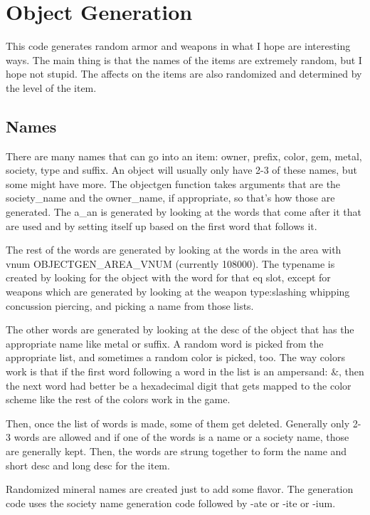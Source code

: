 \chapter{Object Generation}


This code generates random armor and weapons in what I hope are
interesting ways. The main thing is that the names of the items
are extremely random, but I hope not stupid. The affects on the
items are also randomized and determined by the level of the item.

\section{Names}

There are many names that can go into an item: owner, prefix, color, gem,
metal, society, type and suffix. An object will usually only have 2-3 of these
names, but some might have more. The objectgen function takes arguments that
are the society\_name and the owner\_name, if appropriate, so that's how
those are generated. The a\_an is generated by looking at the words that
come after it that are used and by setting itself up based on the 
first word that follows it.

The rest of the words are generated by looking at the words in the area with
vnum OBJECTGEN\_AREA\_VNUM (currently 108000). The typename is created
by looking for the object with the word for that eq slot, except for
weapons which are generated by looking at the weapon type:slashing whipping
concussion piercing, and picking a name from those lists.

The other words are generated by looking at the desc of the object
that has the appropriate name like metal or suffix. A random word is
picked from the appropriate list, and sometimes a random color is
picked, too. The way colors work is that if the first word following
a word in the list is an ampersand: $\&$, then the next word had
better be a hexadecimal digit that gets mapped to the color scheme like
the rest of the colors work in the game.

Then, once the list of words is made, some of them get deleted. Generally
only 2-3 words are allowed and if one of the words is a name or a
society name, those are generally kept. Then, the words are strung
together to form the name and short desc and long desc for the item.

Randomized mineral names are created just to add some flavor. The generation
code uses the society name generation code followed by -ate or -ite or -ium.

